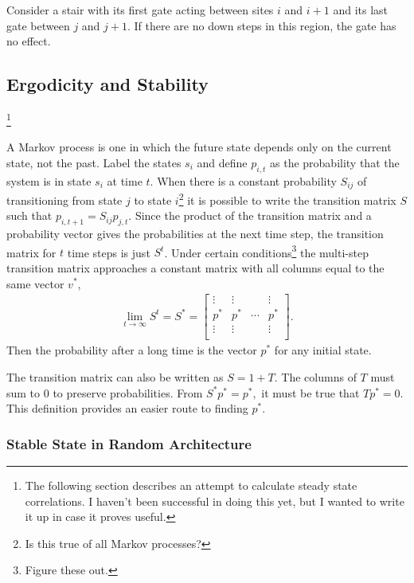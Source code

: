 Consider a stair with its first gate acting between sites $i$ and $i+1$ and its last gate between $j$ and $j+1$. If there are no down steps in this region, the gate has no effect. 

\subsection{Ergodicity and Stability}\footnote{The following section describes an attempt to calculate steady state correlations. I haven't been successful in doing this yet, but I wanted to write it up in case it proves useful.} \label{sub:erg}\emph{}

A Markov process is one in which the future state depends only on the current state, not the past. Label the states $s_i$ and define $p_{i,t}$ as the probability that the system is in state $s_i$ at time $t$. When there is a constant probability $S_{ij}$ of transitioning from state $j$ to state $i$\footnote{Is this true of all Markov processes?} it is possible to write the transition matrix $S$ such that $p_{i,t+1}= S_{ij}p_{j,t}$. Since the product of the transition matrix and a probability vector gives the probabilities at the next time step, the transition matrix for $t$ time steps is just $S^t$. Under certain conditions\footnote{Figure these out.} the multi-step transition matrix approaches a constant matrix with all columns equal to the same vector $v^*$,
\begin{align}
\lim\limits_{t\to \infty}S^t = S^* = \begin{bmatrix}
\vdots & \vdots &  & \vdots\\
p^* & p^* & \cdots & p^*\\
\vdots & \vdots &  & \vdots\\
\end{bmatrix}.
\end{align}
Then the probability after a long time is the vector $p^*$ for any initial state.

The transition matrix can also be written as $S = 1+T$. The columns of $T$ must sum to 0 to preserve probabilities. From $S^*p^* = p^*,$ it must be true that $Tp^*=0$. This definition provides an easier route to finding $p^*$.

\subsubsection{Stable State in Random Architecture} \emph{} \label{subsub:randstate}

